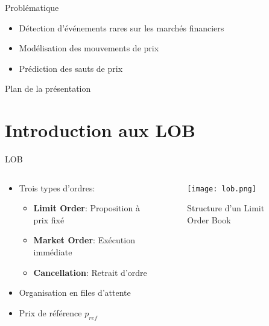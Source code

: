 \documentclass[aspectratio=169]{beamer}  %
\begin{document}
\begin{frame}{Problématique}
    \begin{itemize}
        \item Détection d'événements rares sur les marchés financiers
        \item Modélisation des mouvements de prix
        \item Prédiction des sauts de prix
    \end{itemize}
\end{frame}


\begin{frame}{Plan de la présentation}
    \tableofcontents
\end{frame}

\section{Introduction aux LOB}
\begin{frame}{LOB}
    \begin{columns}[onlytextwidth,totalwidth=\textwidth,columnsep=1em]
        \begin{column}{0.55\textwidth}
            \begin{itemize}
                \item Trois types d'ordres:
                \begin{itemize}
                    \item \textbf{Limit Order}: Proposition à prix fixé
                    \item \textbf{Market Order}: Exécution immédiate
                    \item \textbf{Cancellation}: Retrait d'ordre
                \end{itemize}
                \item Organisation en files d'attente
                \item Prix de référence $p_{ref}$
            \end{itemize}
        \end{column}
        \begin{column}{0.45\textwidth}
            \begin{figure}
                \centering
                \texttt{[image: lob.png]}
                \caption{Structure d'un Limit Order Book}
            \end{figure}
        \end{column}
    \end{columns}
\end{frame}
\end{document}
